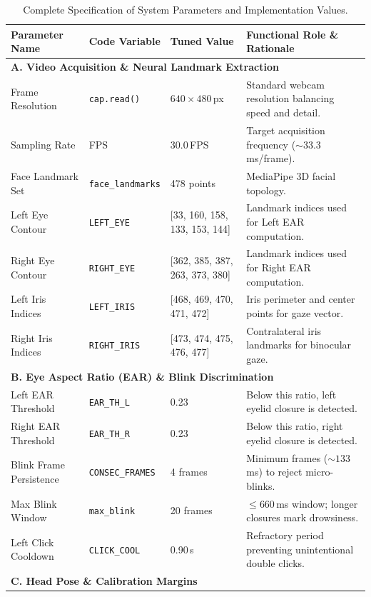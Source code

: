 \documentclass[11pt,a4paper]{article}
\begin{document}
\begin{table}[H]
\centering
\caption{Complete Specification of System Parameters and Implementation Values.}
\small
\begin{tabularx}{\textwidth}{p{} p{} p{} X}
\toprule
\textbf{Parameter Name} & \textbf{Code Variable} & \textbf{Tuned Value} & \textbf{Functional Role \& Rationale} \\
\midrule
\multicolumn{4}{l}{\textbf{A. Video Acquisition \& Neural Landmark Extraction}} \\
Frame Resolution & \texttt{cap.read()} & $640 \times 480$\,px & Standard webcam resolution balancing speed and detail. \\
Sampling Rate & FPS & 30.0\,FPS & Target acquisition frequency ($\sim 33.3$\,ms/frame). \\
Face Landmark Set & \texttt{face\_landmarks} & 478 points & MediaPipe 3D facial topology. \\
Left Eye Contour & \texttt{LEFT\_EYE} & [33, 160, 158, 133, 153, 144] & Landmark indices used for Left EAR computation. \\
Right Eye Contour & \texttt{RIGHT\_EYE} & [362, 385, 387, 263, 373, 380] & Landmark indices used for Right EAR computation. \\
Left Iris Indices & \texttt{LEFT\_IRIS} & [468, 469, 470, 471, 472] & Iris perimeter and center points for gaze vector. \\
Right Iris Indices & \texttt{RIGHT\_IRIS} & [473, 474, 475, 476, 477] & Contralateral iris landmarks for binocular gaze. \\
\midrule
\multicolumn{4}{l}{\textbf{B. Eye Aspect Ratio (EAR) \& Blink Discrimination}} \\
Left EAR Threshold & \texttt{EAR\_TH\_L} & 0.23 & Below this ratio, left eyelid closure is detected. \\
Right EAR Threshold & \texttt{EAR\_TH\_R} & 0.23 & Below this ratio, right eyelid closure is detected. \\
Blink Frame Persistence & \texttt{CONSEC\_FRAMES} & 4 frames & Minimum frames ($\sim 133$\,ms) to reject micro-blinks. \\
Max Blink Window & \texttt{max\_blink} & 20 frames & $\le 660$\,ms window; longer closures mark drowsiness. \\
Left Click Cooldown & \texttt{CLICK\_COOL} & 0.90\,s & Refractory period preventing unintentional double clicks. \\
\midrule
\multicolumn{4}{l}{\textbf{C. Head Pose \& Calibration Margins}} \\

\end{tabularx}
\end{table}
\end{document}
